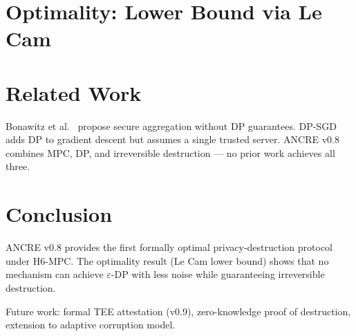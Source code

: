 \documentclass{article}
\begin{document}






\section{Optimality: Lower Bound via Le Cam}









\section{Related Work}

Bonawitz et al.~\cite{Bonawitz2017} propose
secure aggregation without DP guarantees.
DP-SGD~\cite{Abadi2016} adds DP to gradient
descent but assumes a single trusted server.
ANCRE v0.8 combines MPC, DP, and irreversible
destruction --- no prior work achieves all three.

\section{Conclusion}

ANCRE v0.8 provides the first formally optimal
privacy-destruction protocol under H6-MPC.
The optimality result (Le Cam lower bound)
shows that no mechanism can achieve
$\varepsilon$-DP with less noise while
guaranteeing irreversible destruction.

Future work: formal TEE attestation (v0.9),
zero-knowledge proof of destruction,
extension to adaptive corruption model.



\end{document}

